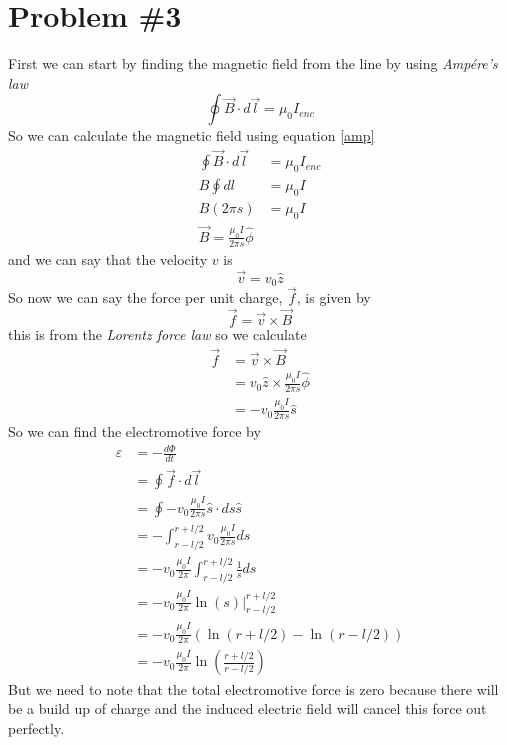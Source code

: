 \documentclass[11pt]{article}
\numberwithin{equation}{section}
\begin{document}
\section{Problem \#3}
First we can start by finding the magnetic field from the line by using \emph{Amp\'{e}re's law}
\begin{equation}
\oint\vec{B}\cdot d\vec{l} = \mu_0 I_{enc}
\label{amp}
\end{equation}
So we can calculate the magnetic field using equation \ref{amp}
\begin{align*}
\oint\vec{B}\cdot d\vec{l} &= \mu_0 I_{enc}\\
B\oint d{l} &= \mu_0 I\\
B(2\pi s) &= \mu_0 I\\
\vec{B} = \frac{\mu_0I}{2\pi s}\hat{\phi}
\end{align*}
and we can say that the velocity $v$ is
$$\vec{v} = v_0\hat{z}$$
So now we can say the force per unit charge, $\vec{f}$, is given by
$$\vec{f} = \vec{v}\times\vec{B}$$
this is from the \emph{Lorentz force law} so we calculate
\begin{align*}
\vec{f} &= \vec{v}\times\vec{B}\\
&= v_0\hat{z}\times\frac{\mu_0I}{2\pi s}\hat{\phi}\\
&= -v_0\frac{\mu_0I}{2\pi s}\hat{s}
\end{align*}
So we can find the electromotive force by 
\begin{align*}
\varepsilon &= -\frac{d\Phi}{dt} \\
&= \oint\vec{f}\cdot d\vec{l}\\
&= \oint-v_0\frac{\mu_0I}{2\pi s}\hat{s}\cdot ds\hat{s}\\
&= -\int_{r-l/2}^{r+l/2} v_0\frac{\mu_0I}{2\pi s}ds\\
&= -v_0\frac{\mu_0I}{2\pi}\int_{r-l/2}^{r+l/2}\frac{1}{s} ds\\
&= -v_0\frac{\mu_0I}{2\pi}\ln(s)|_{r-l/2}^{r+l/2}\\
&= -v_0\frac{\mu_0I}{2\pi}(\ln({r+l/2}) - \ln({r-l/2}))\\
&= -v_0\frac{\mu_0I}{2\pi}\ln\left(\frac{r+l/2}{r-l/2}\right)
\end{align*}
But we need to note that the total electromotive force is zero because there will be a build up of charge and the induced electric field will cancel this force out perfectly.
\end{document}
